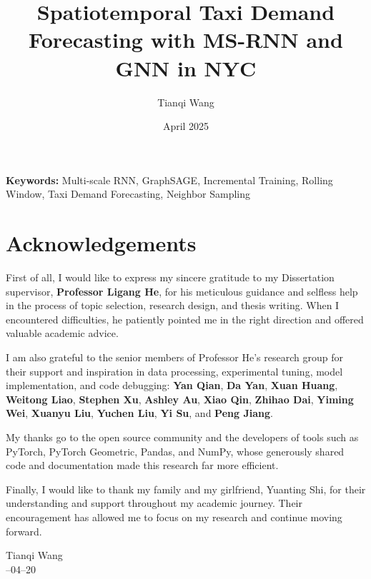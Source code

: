 \documentclass{article}
\title{Spatiotemporal Taxi Demand Forecasting with MS-RNN and GNN in NYC}
\author{Tianqi Wang}
\date{April 2025}
\begin{document}
\maketitle



\noindent\textbf{Keywords:} Multi-scale RNN, GraphSAGE, Incremental Training, Rolling Window, Taxi Demand Forecasting, Neighbor Sampling

\newpage
\section*{Acknowledgements}

First of all, I would like to express my sincere gratitude to my Dissertation supervisor,     
\textbf{Professor Ligang He}, for his meticulous guidance and selfless help in the process of topic selection, research design, and thesis writing. When I encountered difficulties, he patiently pointed me in the right direction and offered valuable academic advice.

I am also grateful to the senior members of Professor He’s research group for their support and inspiration in data processing, experimental tuning, model implementation, and code debugging: \textbf{Yan Qian}, \textbf{Da Yan}, \textbf{Xuan Huang}, \textbf{Weitong Liao}, \textbf{Stephen Xu}, \textbf{Ashley Au}, \textbf{Xiao Qin}, \textbf{Zhihao Dai}, \textbf{Yiming Wei}, \textbf{Xuanyu Liu}, \textbf{Yuchen Liu}, \textbf{Yi Su}, and \textbf{Peng Jiang}.

My thanks go to the open source community and the developers of tools such as PyTorch, PyTorch Geometric, Pandas, and NumPy, whose generously shared code and documentation made this research far more efficient.

Finally, I would like to thank my family and my girlfriend, Yuanting Shi, for their understanding and support throughout my academic journey. Their encouragement has allowed me to focus on my research and continue moving forward.

\vspace{1em}
\noindent Tianqi Wang\\
--04--20
\end{document}
